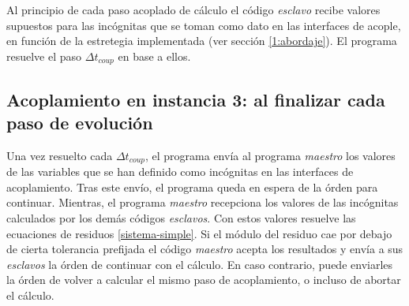 Al principio de cada paso acoplado de cálculo el código \textit{esclavo} recibe valores supuestos para las incógnitas que se toman como dato en las interfaces de acople,
en función de la estretegia implementada (ver sección \ref{1:abordaje}).
El programa resuelve el paso $\Delta t_{coup}$ en base a ellos.

\subsection*{Acoplamiento en instancia 3: al finalizar cada paso de evolución}

Una vez resuelto cada $\Delta t_{coup}$, el programa envía al programa \textit{maestro} los valores de las variables que se han definido como incógnitas en las interfaces de acoplamiento.
Tras este envío, el programa queda en espera de la órden para continuar.
Mientras, el programa \textit{maestro} recepciona los valores de las incógnitas calculados por los demás códigos \textit{esclavos}.
Con estos valores resuelve las ecuaciones de residuos \ref{sistema-simple}.
Si el módulo del residuo cae por debajo de cierta tolerancia prefijada el código \textit{maestro} acepta los resultados y envía a sus \textit{esclavos} la órden de continuar con el cálculo.
En caso contrario, puede enviarles la órden de volver a calcular el mismo paso de acoplamiento, o incluso de abortar el cálculo.




